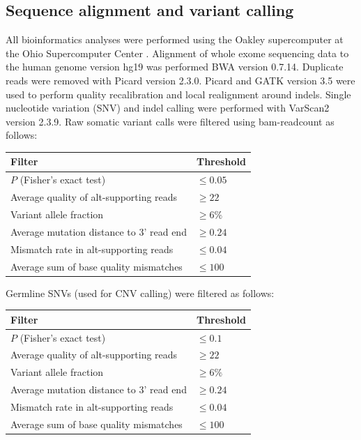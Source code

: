\subsection{Sequence alignment and variant calling}
\label{ssec:240:alignment_variant_calling}
All bioinformatics analyses were performed using the Oakley supercomputer at the Ohio Supercomputer Center \cite{Oakley2012}. Alignment of whole exome sequencing data to the human genome version hg19 \cite{lander2001} was performed BWA \cite{bwa} version 0.7.14. Duplicate reads were removed with Picard \cite{Picard2019toolkit} version 2.3.0. Picard and GATK \cite{mckenna10} version 3.5 were used to perform quality recalibration and local realignment around indels. Single nucleotide variation (SNV) and indel calling were performed with VarScan2 \cite{varscan2} version 2.3.9. Raw somatic variant calls were filtered using bam-readcount \cite{bamreadcount} as follows:
\begin{table}[H]
	\centering
	\begin{tabular}{l|l}
		Filter                                   & Threshold  \\
		\hline
		$P$ (Fisher's exact test)                & $\le 0.05$ \\
		Average quality of alt-supporting reads  & $\ge 22$   \\
		Variant allele fraction                  & $\ge 6\%$  \\
		Average mutation distance to 3' read end & $\ge 0.24$ \\
		Mismatch rate in alt-supporting reads    & $\le 0.04$ \\
		Average sum of base quality mismatches   & $\le 100$
	\end{tabular}
	\label{table:240:somaticSNVfilter}
\end{table}
\noindent Germline SNVs (used for CNV calling) were filtered as follows:
\begin{table}[H]
	\centering
	\begin{tabular}{l|l}
		Filter                                   & Threshold  \\
		\hline
		$P$ (Fisher's exact test)                & $\le 0.1$  \\
		Average quality of alt-supporting reads  & $\ge 22$   \\
		Variant allele fraction                  & $\ge 6\%$  \\
		Average mutation distance to 3' read end & $\ge 0.24$ \\
		Mismatch rate in alt-supporting reads    & $\le 0.04$ \\
		Average sum of base quality mismatches   & $\le 100$
	\end{tabular}
\end{table}
